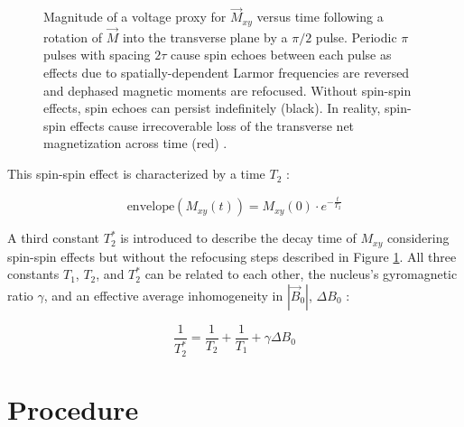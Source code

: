 \documentclass[11pt]{article}
\begin{document}
\begin{figure}[H]
  \caption{Magnitude of a voltage proxy for $\vec M_{xy}$ versus time
    following a rotation of $\vec M$ into the transverse plane by a
    $\pi/2$ pulse. Periodic $\pi$ pulses with spacing $2 \tau$ cause
    spin echoes between each pulse as effects due to
    spatially-dependent Larmor frequencies are reversed and
    dephased magnetic moments are refocused. Without spin-spin effects,
    spin echoes can persist indefinitely (black). In reality,
    spin-spin effects cause
    irrecoverable loss of the transverse net magnetization across time
  (red) \cite{mel}.}
  \label{fig:spin_echo}
\end{figure}

This spin-spin effect is characterized by a time $T_2$ \cite{mel}:

\begin{equation}
  \text{envelope}(M_{xy}(t)) = M_{xy}(0) \cdot e^{- \frac{t}{T_2}}
  \label{eq:spin_spin_relaxation}
\end{equation}

A third constant $T_2^*$ is introduced to describe the decay time of
$M_{xy}$ considering spin-spin effects but without the refocusing
steps described in Figure \ref{fig:spin_echo}. All three constants
$T_1$, $T_2$, and $T_2^*$ can be related to each other, the nucleus's
gyromagnetic ratio $\gamma$,
and an effective average inhomogeneity in $|\vec B_0|$, $\Delta B_0$
\cite{mel, harris}:

\begin{equation}
  \frac{1}{T_2^*} = \frac{1}{T_2} + \frac{1}{T_1} + \gamma \Delta B_0
  \label{eq:const_relation}
\end{equation}

\section{Procedure}
\end{document}
